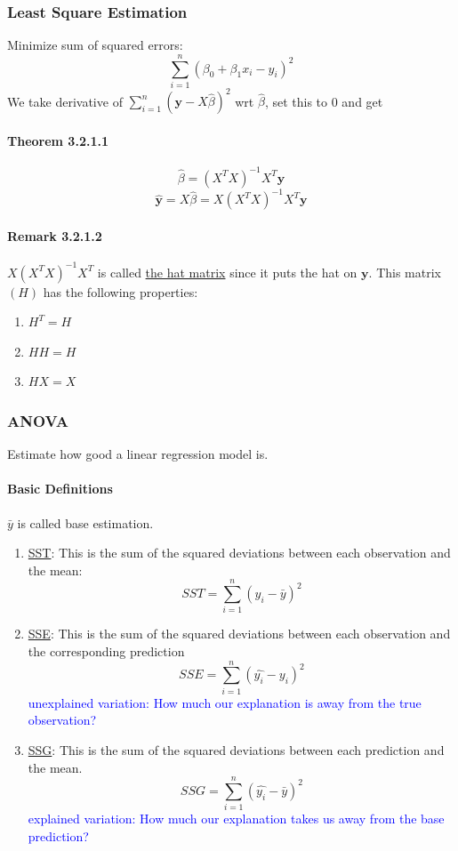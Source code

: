 \documentclass[11pt]{article}
\newcommand{\tb}[1]{\textbf{#1}}
\newcommand{\under}[1]{\underline{#1}}
\newcommand{\vy}[0]{\tb{y}}
\begin{document}
\subsubsection{Least Square Estimation}
Minimize sum of squared errors: $$\sum_{i=1}^n (\beta_0 + \beta_1 x_i - y_i)^2$$
We take derivative of $\sum_{i=1}^n (\vy - X\hat{\beta})^2$ wrt $\hat{\beta}$, set this to 0 and get 
\paragraph{Theorem 3.2.1.1}$$\hat{\beta} = (X^TX)^{-1}X^T\vy$$
$$\hat{\vy} = X\hat{\beta} = X(X^TX)^{-1}X^T\vy$$
\paragraph{Remark 3.2.1.2}
$X(X^TX)^{-1}X^T$ is called \under{the hat matrix} since it puts the hat on $\vy$. This matrix $(H)$ has the following properties:
\begin{enumerate}
    \item $H^T = H$
    \item $HH = H$
    \item $HX = X$
\end{enumerate}
\subsubsection{ANOVA}
Estimate how good a linear regression model is.
\paragraph{Basic Definitions}
$\bar{y}$ is called base estimation.
\begin{enumerate}
	\item \under{SST}: This is the sum of the squared deviations between each observation and the mean:
	$$SST = \sum_{i=1}^n(y_{i}-\bar{y})^2$$
	\item \under{SSE}: This is the sum of the squared deviations between each observation and the corresponding prediction
	$$SSE = \sum_{i=1}^n(\hat{y_i} - y_i)^2$$
	\textcolor{blue}{unexplained variation: How much our explanation is away from the true observation?}
	\item \under{SSG}: This is the sum of the squared deviations between each prediction and the mean.
	$$SSG = \sum_{i=1}^n(\hat{y_i}-\bar{y})^2$$
	\textcolor{blue}{explained variation: How much our explanation takes us away from the base prediction?}
\end{enumerate}
\end{document}
